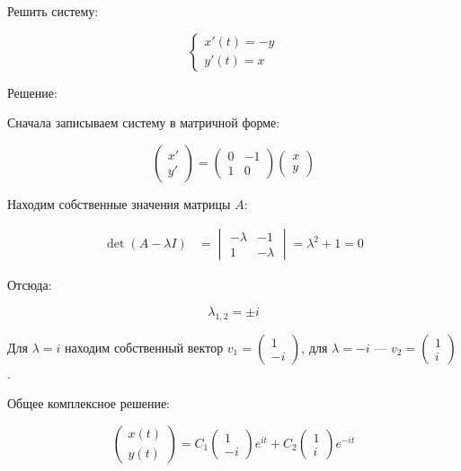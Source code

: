 Решить систему:

\begin{equation*}
    \begin{cases}
        x'(t) = -y \\
        y'(t) = x
    \end{cases}
\end{equation*}

Решение:

Сначала записываем систему в матричной форме:

\begin{equation*}
    \begin{pmatrix} x' \\ y' \end{pmatrix} =
    \begin{pmatrix}
        0 & -1 \\
        1 & 0
    \end{pmatrix}
    \begin{pmatrix} x \\ y \end{pmatrix}
\end{equation*}

Находим собственные значения матрицы \(A\):

\begin{align*}
    \det(A - \lambda I) &=
    \begin{vmatrix}
        -\lambda & -1 \\
        1 & -\lambda
    \end{vmatrix} = \lambda^2 + 1 = 0
\end{align*}

Отсюда:

\begin{equation*}
    \lambda_{1,2} = \pm i
\end{equation*}

Для \(\lambda = i\) находим собственный вектор \(v_1 = \begin{pmatrix} 1 \\ -i \end{pmatrix}\), для \(\lambda = -i\) — \(v_2 = \begin{pmatrix} 1 \\ i \end{pmatrix}\).

Общее комплексное решение:

\begin{equation*}
    \begin{pmatrix} x(t) \\ y(t) \end{pmatrix} = C_1
    \begin{pmatrix} 1 \\ -i \end{pmatrix} e^{i t} +
    C_2
    \begin{pmatrix} 1 \\ i \end{pmatrix} e^{-i t}
\end{equation*}

